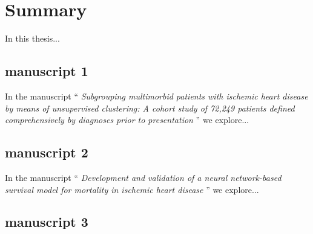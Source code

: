 \chapter{Summary}

In this thesis...

\section{manuscript 1}

In the manuscript \enquote{\textit{%
    Subgrouping multimorbid patients with ischemic heart disease by means 
    of unsupervised clustering: A cohort study of 72,249 patients
    defined comprehensively by diagnoses prior to presentation
}} we explore...

\section{manuscript 2}

In the manuscript \enquote{\textit{%
    Development and validation of a neural network-based survival model for
    mortality in ischemic heart disease
}} we explore...

\section{manuscript 3}
